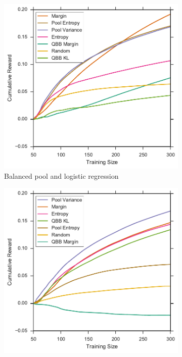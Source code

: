 \begin{figure}[p]
	\centering
	\begin{subfigure}{.5\textwidth}
		\centering
		\includegraphics[width=\textwidth]{figures/5_thompson/sdss_bl_sum_rewards}
		\caption{Balanced pool and logistic regression}
		\label{fig:sdss_bl_sum_rewards}
	\end{subfigure}%
	\begin{subfigure}{.5\textwidth}
		\centering
		\includegraphics[width=\linewidth]{figures/5_thompson/sdss_br_sum_rewards}

\end{subfigure}
\end{figure}
